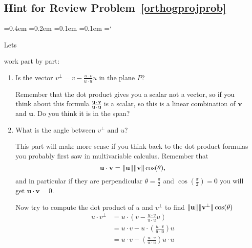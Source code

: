 
\subsection*{Hint  for Review Problem~\ref{orthogprojprob}}

{\ttfamily
{}\font=0.4em
\font=0.2em
\font=0.1em
\font=0.1em
\hyphenchar\font=`\-


\hypertarget{scripts_orthonormal_bases_hint3}{Lets} 
work part by part:
\begin{enumerate}\renewcommand{\theenumi}{(\alph*{enumi})}
\item Is the vector $v^\bot = v-\frac{u\cdot v}{u\cdot u}u$ in the plane $P$? 

Remember that the dot product gives you a scalar not a vector, so if you think about this formula $\frac{\mathbf{u}\cdot \mathbf{v}}{\mathbf{u}\cdot \mathbf{u}}$ is a scalar, so this is a linear combination of $\mathbf{v}$ and $\mathbf{u}$. Do you think it is in the span?

\item What is the angle between $v^\bot$ and $u$?

This part will make more sense if you think back to the dot product formulas you probably first saw in multivariable calculus. Remember that 
\[\mathbf{u}\cdot \mathbf{v} = \|\mathbf{u}\| \|\mathbf{v}\| \cos(\theta),
\] 
and in particular if they are perpendicular $\theta = \frac{\pi}{2}$ and $\cos(\frac{\pi}{2}) = 0$ you will get $\mathbf{u}\cdot \mathbf{v} = 0$.

Now try to compute the dot product of $u$ and $v^\bot$ to find $ \|\mathbf{u}\| \|\mathbf{v^\bot}\| \cos(\theta)$
\begin{align*}
u\cdot v^\bot &= u\cdot \left( v  -  \frac{u\cdot v}{u\cdot u}u \right) \\
&= u\cdot  v  - u\cdot \left( \frac{u\cdot v}{u\cdot u} \right)u \\
&= u\cdot  v  - \left( \frac{u\cdot v}{u\cdot u} \right) u\cdot u
\end{align*}


\end{enumerate}}
